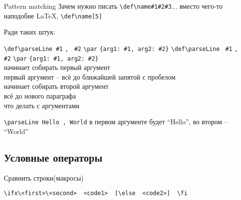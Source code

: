 \begin{frame}[fragile]{Pattern matching\tW}\relax
    Зачем нужно писать \lstinline|\def\name#1#2#3|... вместо чего-то наподобие \LaTeX, \lstinline|\def\name[5]|\inpause
    
    Ради таких штук:
    \footnotesize
     \begin{tabbing}
     
        \lstinline|\def\parseLine |\= \lstinline|#1| \= \lstinline|, | \= \lstinline|#2| \= \lstinline|\par| \= \lstinline|{arg1: #1, arg2: #2}|\kill
        \lstinline|\def\parseLine |\> \lstinline|#1| \> \lstinline|, | \> \lstinline|#2| \> \lstinline|\par| \> \lstinline|{arg1: #1, arg2: #2}|\\
        \>\footnotesize  начинает собирать первый аргумент \> \>  \>  \> \\
        \> \>\tiny  первый аргумент -- всё до ближайшей запятой с пробелом \> \>  \> \\
        \> \> \>\footnotesize  начинает собирать второй аргумент  \>  \> \\
        \> \> \>  \> \footnotesize  всё до нового параграфа  \> \\
        \> \> \>  \>  \>\footnotesize  что делать с аргументами \\
        
    \end{tabbing}\vspace*{-2ex}
    \lstinline|\parseLine Hello , World| в первом аргументе будет ``Hello'', во втором -- ``World''
\end{frame}

\subsection{Условные операторы}

\begin{frame}[fragile]{Сравнить строки(макросы)\tW}\relax


    \footnotesize
    {\ccsc \verb|\ifx\<first>\<second>  <code1>  [\else  <code2>]  \fi|}
    
\end{frame}


